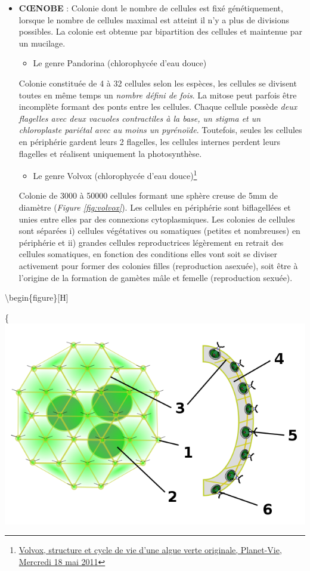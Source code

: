 \documentclass[
]{book}
\providecommand{\tightlist}{%
  \setlength{\itemsep}{0pt}\setlength{\parskip}{0pt}}
\begin{document}
\begin{itemize}
\item
  \textbf{CŒNOBE} : Colonie dont le nombre de cellules est fixé génétiquement, lorsque le nombre de cellules maximal est atteint il n'y a plus de divisions possibles. La colonie est obtenue par bipartition des cellules et maintenue par un mucilage.

  \begin{itemize}
  \tightlist
  \item
    Le genre Pandorina (chlorophycée d'eau douce)
  \end{itemize}

  Colonie constituée de 4 à 32 cellules selon les espèces, les cellules se divisent toutes en même temps un \emph{nombre défini de fois}. La mitose peut parfois être incomplète formant des ponts entre les cellules. Chaque cellule possède \emph{deux flagelles avec deux vacuoles contractiles à la base, un stigma et un chloroplaste pariétal avec au moins un pyrénoïde}. Toutefois, seules les cellules en périphérie gardent leurs 2 flagelles, les cellules internes perdent leurs flagelles et réalisent uniquement la photosynthèse.

  \begin{itemize}
  \tightlist
  \item
    Le genre Volvox (chlorophycée d'eau douce)\footnote{\href{http://planet-vie.ens.fr/content/volvox-structure-cycle-vie-algue-verte-originale}{Volvox, structure et cycle de vie d'une algue verte originale, Planet-Vie, Mercredi 18 mai 2011}}
  \end{itemize}

  Colonie de 3000 à 50000 cellules formant une sphère creuse de 5mm de diamètre (\emph{Figure \ref{fig:volvox}}). Les cellules en périphérie sont biflagellées et unies entre elles par des connexions cytoplasmiques. Les colonies de cellules sont séparées i) cellules végétatives ou somatiques (petites et nombreuses) en périphérie et ii) grandes cellules reproductrices légèrement en retrait des cellules somatiques, en fonction des conditions elles vont soit se diviser activement pour former des colonies filles (reproduction asexuée), soit être à l'origine de la formation de gamètes mâle et femelle (reproduction sexuée).
\end{itemize}

\textbackslash begin\{figure\}{[}H{]}

\{\centering \includegraphics[width=0.7\linewidth]{./images/volvox}
\end{document}
